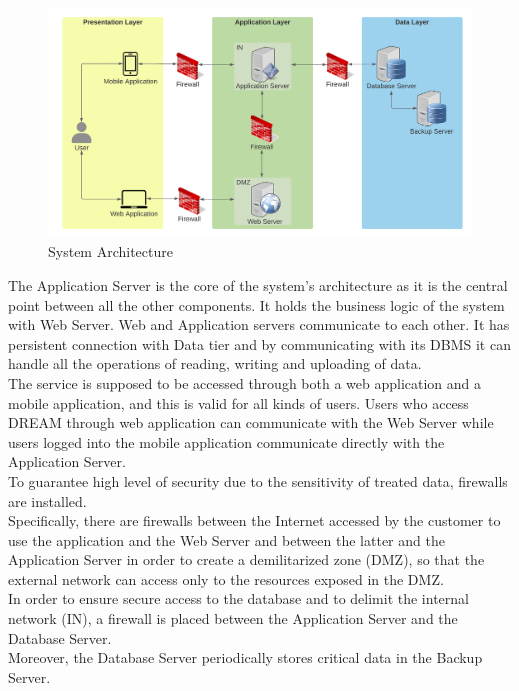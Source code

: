 \begin{center}
    \begin{figure}[h!]
  \includegraphics[width=\textwidth,height=\textheight,keepaspectratio]{./Images/System Architecture.png}
  \caption{System Architecture}
\end{figure}
\end{center}

The Application Server is the core of the system’s architecture as it is the central point between all the other components. It holds the business logic of the system with Web Server. Web and Application servers communicate to each other. It has persistent connection with Data tier and by communicating with its DBMS it can handle all the operations of reading, writing and uploading of data.\\

The service is supposed to be accessed through both a web application and a mobile application, and this is valid for all kinds of users. Users who access DREAM through web application can communicate with the Web Server while users logged into the mobile application communicate directly with the Application Server.\\

To guarantee high level of security due to the sensitivity of treated data, firewalls are installed.\\
Specifically, there are firewalls between the Internet accessed by the customer to use the application and the Web Server and between the latter and the Application Server in order to create a demilitarized zone (DMZ), so that the external network can access only to the resources exposed in the DMZ. \\
In order to ensure secure access to the database and to delimit the internal network (IN), a firewall is placed between the Application Server and the Database Server.\\
Moreover, the Database Server periodically stores critical data in the Backup Server. \\

